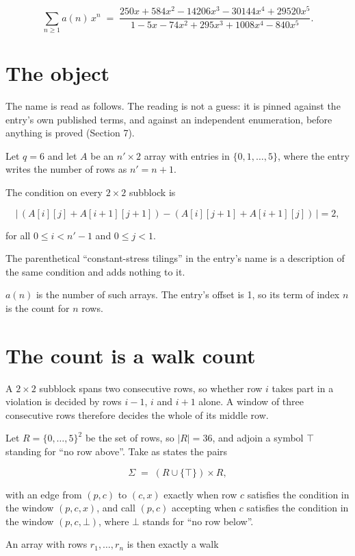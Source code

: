 \documentclass[11pt]{article}
\theoremstyle{definition}
\begin{document}
\[\sum_{n \ge 1} a(n)\,x^n \;=\; \frac{250x + 584x^{2} - 14206x^{3} - 30144x^{4} + 29520x^{5}}{1 - 5x - 74x^{2} + 295x^{3} + 1008x^{4} - 840x^{5}}.\]

\section{The object}

The name is read as follows. The reading is not a guess: it is pinned against the entry's own published terms, and against an independent enumeration, before anything is proved (Section 7).

Let $q = 6$ and let $A$ be an $n' \times 2$ array with entries in $\{0,1,\dots,5\}$, where the entry writes the number of rows as $n' = n + 1$.

The condition on every $2 \times 2$ subblock is

\[\bigl|\,(A[i][j] + A[i{+}1][j{+}1]) - (A[i][j{+}1] + A[i{+}1][j])\,\bigr| = 2,\]

for all $0 \le i < n'-1$ and $0 \le j < 1$.

The parenthetical ``constant-stress tilings'' in the entry's name is a description of the same condition and adds nothing to it.

$a(n)$ is the number of such arrays. The entry's offset is 1, so its term of index $n$ is the count for $n$ rows.

\section{The count is a walk count}

A $2 \times 2$ subblock spans two consecutive rows, so whether row $i$ takes part in a violation is decided by rows $i-1$, $i$ and $i+1$ alone. A window of three consecutive rows therefore decides the whole of its middle row.

Let $R = \{0,\dots,5\}^{2}$ be the set of rows, so $|R| = 36$, and adjoin a symbol $\top$ standing for ``no row above''. Take as states the pairs

\[\Sigma \;=\; (R \cup \{\top\}) \times R,\]

with an edge from $(p,c)$ to $(c,x)$ exactly when row $c$ satisfies the condition in the window $(p,c,x)$, and call $(p,c)$ accepting when $c$ satisfies the condition in the window $(p,c,\bot)$, where $\bot$ stands for ``no row below''.

An array with rows $r_1,\dots,r_n$ is then exactly a walk
\end{document}
